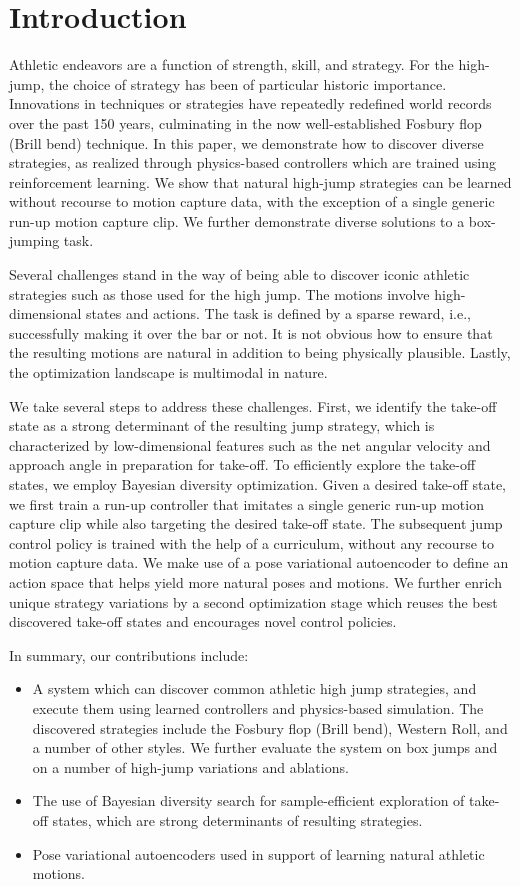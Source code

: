 \section{Introduction}

Athletic endeavors are a function of strength, skill, and strategy. For the high-jump, the choice of strategy has been of particular historic importance. Innovations in techniques or strategies have repeatedly redefined world records over the past 150 years, culminating in the now well-established Fosbury flop (Brill bend) technique. In this paper, we demonstrate how to discover diverse strategies, as realized through physics-based controllers which are trained using reinforcement learning. We show that natural high-jump strategies can be learned without recourse to motion capture data, with the exception of a single generic run-up motion capture clip. We further demonstrate diverse solutions to a box-jumping task.

Several challenges stand in the way of being able to discover iconic athletic strategies such as those used for the high jump. The motions involve high-dimensional states and actions. The task is defined by a sparse reward, i.e., successfully making it over the bar or not. It is not obvious how to ensure that the resulting motions are natural in addition to being physically plausible. Lastly, the optimization landscape is multimodal in nature.

We take several steps to address these challenges. First, we identify the take-off state as a strong determinant of the resulting jump strategy, which is characterized by low-dimensional features such as the net angular velocity and approach angle in preparation for take-off. To efficiently explore the take-off states, we employ Bayesian diversity optimization. Given a desired take-off state, we first train a run-up controller that imitates a single generic run-up motion capture clip while also targeting the desired take-off state. The subsequent jump control policy is trained with the help of a curriculum, without any recourse to motion capture data. We make use of a pose variational autoencoder to define an action space that helps yield more natural poses and motions. We further enrich unique strategy variations by a second optimization stage which reuses the best discovered take-off states and encourages novel control policies.

\newpage
In summary, our contributions include:
\begin{itemize}
    \item A system which can discover common athletic high jump strategies,
        and execute them using learned controllers and physics-based simulation. The discovered strategies include the Fosbury flop (Brill bend), Western Roll, and a number of other styles. We further evaluate the system on box jumps and on a number of high-jump variations and ablations.
    \item The use of Bayesian diversity search for sample-efficient exploration of take-off states, which are strong determinants of resulting strategies.
    \item Pose variational autoencoders used in support of learning natural athletic motions.
\end{itemize}

